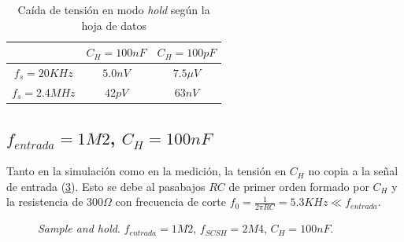 \documentclass[../../ASSD_TP1_G7.tex]{subfiles}
\begin{document}
\begin{table}[H]
	\centering
	\begin{tabular}{|c|c|c|}
	\hline 
	 & $C_H = 100nF$ & $C_H = 100pF$ \\ 
	\hline 
	$f_s = 20KHz$ & $5.0nV $ & $7.5\mu V$ \\ 
	\hline 
	$f_s=2.4MHz$ & $42pV$ & $63nV$ \\ 
	\hline 
	\end{tabular}
	\caption{Ca\'ida de tensi\'on en modo \textit{hold} seg\'un la hoja de datos}
	\label{tab:syh_droop_rate}
\end{table}


\subsection{$f_{entrada}=1M2$, $C_H = 100nF$ } \label{ssec:syh_1m2_2m4_100n}
Tanto en la simulaci\'on como en la medici\'on, la tensi\'on en $C_H$ no copia a la se\~nal de entrada (\ref{fig:syh_1m2_2m4_100n}). Esto se debe al pasabajos $RC$ de primer orden formado por $C_H$ y la resistencia de $300\Omega$ con frecuencia de corte $f_0 = \frac{1}{2\pi RC} = 5.3KHz \ll f_{entrada}$. 

\begin{figure}[H]
	\centering
	\begin{subfigure}[t]{0.45\linewidth}
		
		\label{fig:syh_1m2_2m4_100n_med}
	\end{subfigure}
	\begin{subfigure}[t]{0.45\linewidth}
		
		\label{fig:syh_1m2_2m4_100n_sim}
	\end{subfigure}
	\caption{\textit{Sample and hold}. $f_{entrada} = 1M2$, $f_{SCSH}=2M4$, $C_H = 100nF$.}
	\label{fig:syh_1m2_2m4_100n}
\end{figure}


\end{document}
